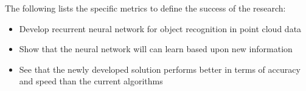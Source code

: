The following lists the specific metrics to define the success of the research:

\begin{itemize}
\item Develop recurrent neural network for object recognition in point cloud data

\item Show that the neural network will can learn based upon new information

\item See that the newly developed solution performs better in terms of accuracy and speed than the current algorithms 

\end{itemize}